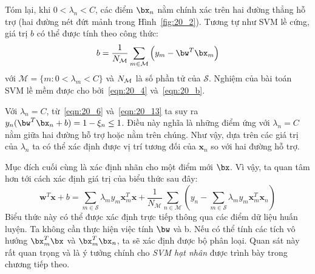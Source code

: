 Tóm lại, khi $0 < \lambda_n < C$, các điểm $\bx_n$ nằm chính xác trên hai đường thẳng hỗ trợ (hai đường nét đứt mảnh trong Hình~\ref{fig:20_2}). Tương tự 
như SVM lề cứng, giá trị $b$ có thể được tính theo công thức:
\begin{equation}
\label{eqn:20_b}
    b = \frac{1}{N_{\mathcal{M}}} \sum_{m\in \mathcal{M}}\left(y_m -
    \bw^T\bx_m\right)
\end{equation}
với $\mathcal{M} = \{m: 0 < \lambda_m < C\}$ và $N_{\mathcal{M}}$ là số phần tử của
$\mathcal{S}$.
Nghiệm của bài toán SVM lề mềm được cho bởi~\eqref{eqn:20_4}
và~\eqref{eqn:20_b}.

Với $\lambda_n = C$, từ~\eqref{eqn:20_6} và~\eqref{eqn:20_13} ta suy ra $y_n(\bw^T\bx_n + b) = 1 - \xi_n \leq 1$. Điều này nghĩa là những điểm ứng với $\lambda_n = C$ nằm
giữa hai đường hỗ trợ hoặc nằm trên chúng. 
Như vậy, dựa trên các giá trị của $\lambda_n$ ta có thể xác định được vị trí
tương đối của $\mathbf{x}_n$ so với hai đường hỗ trợ. 

 
Mục đích cuối cùng là xác định nhãn cho một điểm mới $\bx$. Vì vậy, ta quan tâm hơn tới cách xác định giá
trị
của biểu thức sau đây:
\begin{equation} 
\mathbf{w}^T\mathbf{x} + b = \sum_{m \in \mathcal{S}} \lambda_m y_m \mathbf{x}_m^T \mathbf{x} + \frac{1}{N_{\mathcal{M}}} \sum_{n \in \mathcal{M}} \left(y_n - \sum_{m \in \mathcal{S}} \lambda_m y_m \mathbf{x}_m^T\mathbf{x}_n\right) 
\end{equation} 
Biểu thức này có thể được xác định trực tiếp thông qua các điểm dữ liệu huấn luyện. Ta không cần thực hiện việc tính $\bw$ và b. Nếu có thể tính các tích vô hướng $\bx_m^T\bx$ và
$\bx_m^T\bx_n$, ta sẽ xác định được bộ phân loại. Quan sát này rất quan trọng và là ý tưởng chính cho \textit{SVM hạt nhân} được trình bày trong chương tiếp theo. 

 
